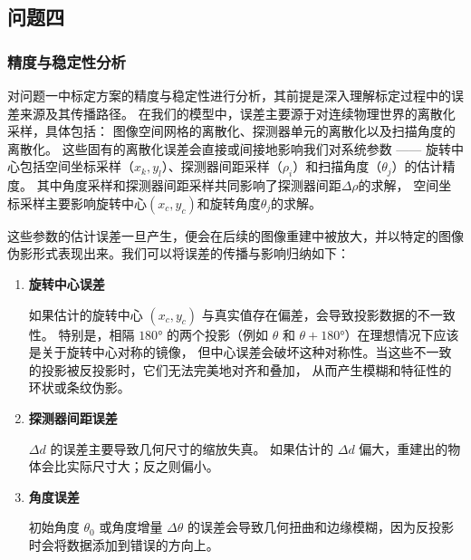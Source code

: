 \subsection{问题四}
\subsubsection{精度与稳定性分析}
对问题一中标定方案的精度与稳定性进行分析，其前提是深入理解标定过程中的误差来源及其传播路径。
在我们的模型中，误差主要源于对连续物理世界的离散化采样，具体包括：
图像空间网格的离散化、探测器单元的离散化以及扫描角度的离散化。
这些固有的离散化误差会直接或间接地影响我们对系统参数 
—— 旋转中心包括空间坐标采样（$x_k,y_l$）、探测器间距采样（$\rho_i$）和扫描角度（$\theta_j$）的估计精度。
其中角度采样和探测器间距采样共同影响了探测器间距$\Delta\rho$的求解，
空间坐标采样主要影响旋转中心$(x_c,y_c)$和旋转角度$\theta_j$的求解。
\par
这些参数的估计误差一旦产生，便会在后续的图像重建中被放大，并以特定的图像伪影形式表现出来。我们可以将误差的传播与影响归纳如下：
\begin{enumerate}[label=(\arabic*), left=0.5em]
    \item \textbf{旋转中心误差} \par
    如果估计的旋转中心 $(x_c,y_c)$ 与真实值存在偏差，会导致投影数据的不一致性。
    特别是，相隔 $180°$ 的两个投影（例如 $\theta$ 和 $\theta+180°$）在理想情况下应该是关于旋转中心对称的镜像，
    但中心误差会破坏这种对称性。当这些不一致的投影被反投影时，它们无法完美地对齐和叠加，
    从而产生模糊和特征性的环状或条纹伪影。  
    \item \textbf{探测器间距误差} \par
    $\Delta d$ 的误差主要导致几何尺寸的缩放失真。
    如果估计的 $\Delta d$ 偏大，重建出的物体会比实际尺寸大；反之则偏小。  
    \item \textbf{角度误差} \par
    初始角度 $\theta_0$ 或角度增量 $\Delta\theta$ 的误差会导致几何扭曲和边缘模糊，因为反投影时会将数据添加到错误的方向上。
\end{enumerate}


